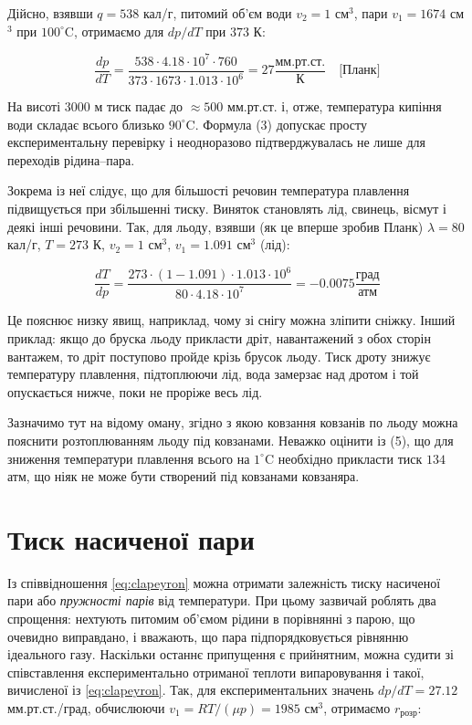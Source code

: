 Дійсно, взявши $q = 538$ кал/г, питомий об'єм води $v_2 = 1$ см$^3$, пари $v_1 = 1674$ см$^3$ при
$100^\circ$C, отримаємо для $dp/dT$ при $373$ К:

\begin{equation}
\frac{dp}{dT} = \frac{538 \cdot 4.18 \cdot 10^7 \cdot 760}{373 \cdot 1673 \cdot 1.013 \cdot 10^6} = 27
\frac{\text{мм.рт.ст.}}{\text{К}} \quad \text{[Планк]}
\end{equation}

На висоті $3000$ м тиск падає до $\approx 500$ мм.рт.ст. і, отже, температура кипіння води складає
всього близько $90^\circ$C. Формула (3) допускає просту експериментальну перевірку і неодноразово
підтверджувалась не лише для переходів рідина--пара.

Зокрема із неї слідує, що для більшості речовин температура плавлення підвищується при збільшенні
тиску. Виняток становлять лід, свинець, вісмут і деякі інші речовини. Так, для льоду, взявши (як це
вперше зробив Планк) $\lambda = 80$ кал/г, $T = 273$ К, $v_2 = 1$ см$^3$, $v_1 = 1.091$ см$^3$ (лід):

\begin{equation}
\frac{dT}{dp} = \frac{273 \cdot (1 - 1.091) \cdot 1.013 \cdot 10^6}{80 \cdot 4.18 \cdot 10^7} =
-0.0075 \frac{\text{град}}{\text{атм}}
\end{equation}

Це пояснює низку явищ, наприклад, чому зі снігу можна зліпити сніжку. Інший приклад: якщо до бруска
льоду прикласти дріт, навантажений з обох сторін вантажем, то дріт поступово пройде крізь брусок
льоду. Тиск дроту знижує температуру плавлення, підтоплюючи лід, вода замерзає над дротом і той
опускається нижче, поки не проріже весь лід.

Зазначимо тут на відому оману, згідно з якою ковзання ковзанів по льоду можна пояснити розтоплюванням
льоду під ковзанами. Неважко оцінити із (5), що для зниження температури плавлення всього на
$1^\circ$C необхідно прикласти тиск $134$ атм, що ніяк не може бути створений під ковзанами ковзаняра.

\section{Тиск насиченої пари}

Із співвідношення \eqref{eq:clapeyron} можна отримати залежність тиску насиченої пари або
\emph{пружності парів} від температури. При цьому зазвичай роблять два спрощення: нехтують питомим
об'ємом рідини в порівнянні з парою, що очевидно виправдано, і вважають, що пара підпорядковується
рівнянню ідеального газу. Наскільки останнє припущення є прийнятним, можна судити зі співставлення
експериментально отриманої теплоти випаровування і такої, вичисленої із \eqref{eq:clapeyron}. Так, для
експериментальних значень $dp/dT = 27.12$ мм.рт.ст./град, обчислюючи $v_1 = RT/(\mu p) = 1985$ см$^3$,
отримаємо $r_{\text{розр}}$:

